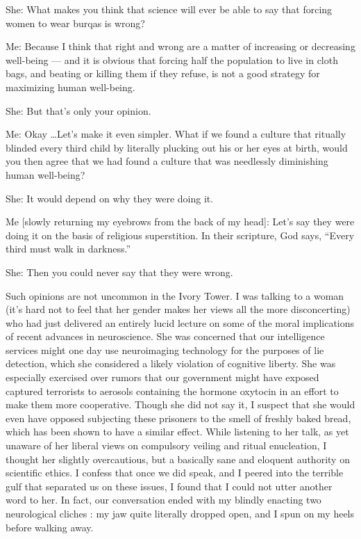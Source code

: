 \documentclass[a4paper,14pt]{extbook}
\begin{document}
She:
What makes you think that science will ever be able to say that forcing women to wear burqas is wrong?

Me:
Because I think that right and wrong are a matter of increasing or decreasing well-being --- and it is obvious that forcing half the population to live in cloth bags, and beating or killing them if they refuse, is not a good strategy for maximizing human well-being.

She:
But that's only your opinion.

Me:
Okay \dots Let's make it even simpler.
What if we found a culture that ritually blinded every third child by literally plucking out his or her eyes at birth, would you then agree that we had found a culture that was needlessly diminishing human well-being?

She:
It would depend on why they were doing it.

Me [slowly returning my eyebrows from the back of my head]:
Let's say they were doing it on the basis of religious superstition.
In their scripture, God says, ``Every third must walk in darkness.''

She:
Then you could never say that they were wrong.

Such opinions are not uncommon in the Ivory Tower.
I was talking to a woman (it's hard not to feel that her gender makes her views all the more disconcerting) who had just delivered an entirely lucid lecture on some of the moral implications of recent advances in neuroscience.
She was concerned that our intelligence services might one day use neuroimaging technology for the purposes of lie detection, which she considered a likely violation of cognitive liberty.
She was especially exercised over rumors that our government might have exposed captured terrorists to aerosols containing the hormone oxytocin in an effort to make them more cooperative.
Though she did not say it, I suspect that she would even have opposed subjecting these prisoners to the smell of freshly baked bread, which has been shown to have a similar effect.
While listening to her talk, as yet unaware of her liberal views on compulsory veiling and ritual enucleation, I thought her slightly overcautious, but a basically sane and eloquent authority on scientific ethics.
I confess that once we did speak, and I peered into the terrible gulf that separated us on these issues, I found that I could not utter another word to her.
In fact, our conversation ended with my blindly enacting two neurological cliches :
my jaw quite literally dropped open, and I spun on my heels before walking away.
\end{document}
